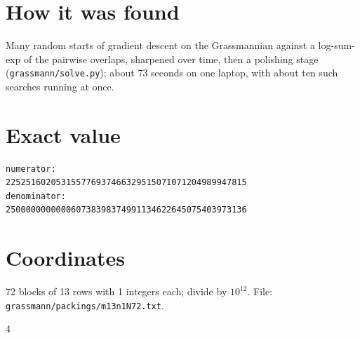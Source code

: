 \documentclass[11pt,a4paper]{article}
\begin{document}
\section{How it was found}
Many random starts of gradient descent on the Grassmannian against a log-sum-exp of the pairwise overlaps, sharpened over time, then a polishing stage (\texttt{grassmann/solve.py}); about 73 seconds on one laptop, with about ten such searches running at once.


\appendix
\section{Exact value}
{\small
\begin{verbatim}
numerator:
225251602053155776937466329515071071204989947815
denominator:
250000000000060738398374991134622645075403973136
\end{verbatim}}

\section{Coordinates}
72 blocks of 13 rows with 1 integers each; divide by $10^{12}$. File: \texttt{grassmann/packings/m13n1N72.txt}.
{\tiny
\begin{multicols}{4}
\end{multicols}}
\end{document}
